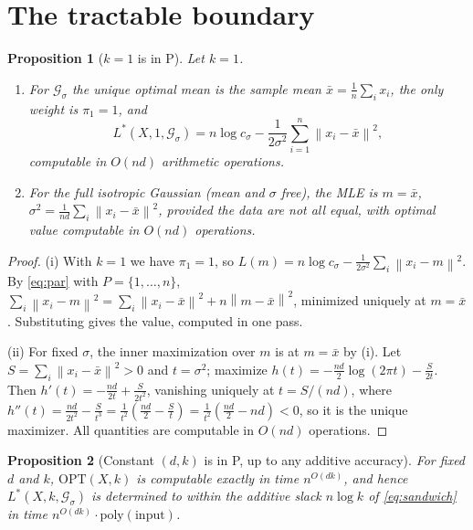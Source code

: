 \documentclass{amsart}
\theoremstyle{plain}
\newtheorem{proposition}{Proposition}
\theoremstyle{definition}
\newcommand{\norm}[1]{\left\lVert #1 \right\rVert}
\begin{document}
\section{The tractable boundary}

\begin{proposition}[$k=1$ is in P]\label{prop:k1}
Let $k=1$.
\begin{enumerate}
\item[(i)] For $\mathcal G_{\sigma}$ the unique optimal mean is the sample mean
$\bar x=\frac1n\sum_{i}x_{i}$, the only weight is $\pi_{1}=1$, and
\[
L^{\ast}(X,1,\mathcal G_{\sigma})=n\log c_{\sigma}-\frac{1}{2\sigma^{2}}\sum_{i=1}^{n}\norm{x_{i}-\bar x}^{2},
\]
computable in $O(nd)$ arithmetic operations.
\item[(ii)] For the full isotropic Gaussian (mean and $\sigma$ free), the MLE is
$m=\bar x$, $\sigma^{2}=\frac{1}{nd}\sum_{i}\norm{x_{i}-\bar x}^{2}$, provided the
data are not all equal, with optimal value computable in $O(nd)$ operations.
\end{enumerate}
\end{proposition}

\begin{proof}
(i) With $k=1$ we have $\pi_{1}=1$, so
$L(m)=n\log c_{\sigma}-\frac{1}{2\sigma^{2}}\sum_{i}\norm{x_{i}-m}^{2}$. By
\eqref{eq:par} with $P=\{1,\dots,n\}$, $\sum_{i}\norm{x_{i}-m}^{2}
=\sum_{i}\norm{x_{i}-\bar x}^{2}+n\norm{m-\bar x}^{2}$, minimized uniquely at
$m=\bar x$. Substituting gives the value, computed in one pass.

(ii) For fixed $\sigma$, the inner maximization over $m$ is at $m=\bar x$ by (i).
Let $S=\sum_{i}\norm{x_{i}-\bar x}^{2}>0$ and $t=\sigma^{2}$; maximize
$h(t)=-\tfrac{nd}{2}\log(2\pi t)-\tfrac{S}{2t}$. Then
$h'(t)=-\tfrac{nd}{2t}+\tfrac{S}{2t^{2}}$, vanishing uniquely at $t=S/(nd)$, where
$h''(t)=\tfrac{nd}{2t^{2}}-\tfrac{S}{t^{3}}=\tfrac{1}{t^{2}}(\tfrac{nd}{2}-\tfrac{S}{t})
=\tfrac{1}{t^{2}}(\tfrac{nd}{2}-nd)<0$, so it is the unique maximizer. All
quantities are computable in $O(nd)$ operations.
\end{proof}

\begin{proposition}[Constant $(d,k)$ is in P, up to any additive accuracy]\label{prop:dk}
For fixed $d$ and $k$, $\mathrm{OPT}(X,k)$ is computable exactly in time
$n^{O(dk)}$, and hence $L^{\ast}(X,k,\mathcal G_{\sigma})$ is determined to within
the additive slack $n\log k$ of \eqref{eq:sandwich} in time $n^{O(dk)}\cdot
\mathrm{poly}(\text{input})$.
\end{proposition}
\end{document}
